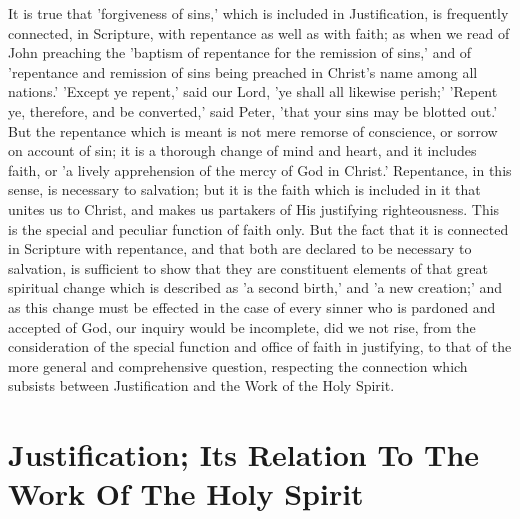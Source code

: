 \documentclass[
]{book}
\begin{document}
It is true that 'forgiveness of sins,' which is included in Justification, is frequently connected, in Scripture, with repentance as well as with faith; as when we read of John preaching the 'baptism of repentance for the remission of sins,' and of 'repentance and remission of sins being preached in Christ's name among all nations.' 'Except ye repent,' said our Lord, 'ye shall all likewise perish;' 'Repent ye, therefore, and be converted,' said Peter, 'that your sins may be blotted out.' But the repentance which is meant is not mere remorse of conscience, or sorrow on account of sin; it is a thorough change of mind and heart, and it includes faith, or 'a lively apprehension of the mercy of God in Christ.' Repentance, in this sense, is necessary to salvation; but it is the faith which is included in it that unites us to Christ, and makes us partakers of His justifying righteousness. This is the special and peculiar function of faith only. But the fact that it is connected in Scripture with repentance, and that both are declared to be necessary to salvation, is sufficient to show that they are constituent elements of that great spiritual change which is described as 'a second birth,' and 'a new creation;' and as this change must be effected in the case of every sinner who is pardoned and accepted of God, our inquiry would be incomplete, did we not rise, from the consideration of the special function and office of faith in justifying, to that of the more general and comprehensive question, respecting the connection which subsists between Justification and the Work of the Holy Spirit.

\hypertarget{justification-its-relation-to-the-work-of-the-holy-spirit}{%
\chapter{Justification; Its Relation To The Work Of The Holy Spirit}\label{justification-its-relation-to-the-work-of-the-holy-spirit}}
\end{document}
